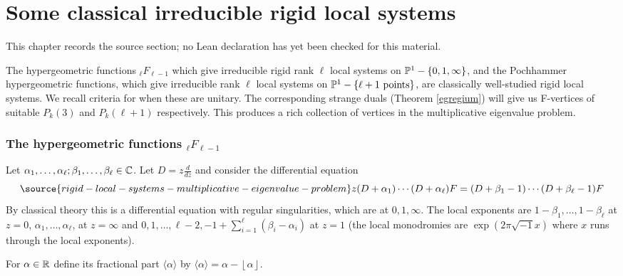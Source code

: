 \chapter{Some classical irreducible rigid local systems}
\label{rigid-local-systems-multiplicative-eigenvalue-problem-chapter-14}

\begin{remark}
\label{rigid-local-systems-multiplicative-eigenvalue-problem-chapter-14-source}
This chapter records the source section; no Lean declaration has yet been checked for this material.
\notready
\end{remark}

\label{classH}
The hypergeometric functions ${}_{\ell}F_{\ell-1}$ which give irreducible rigid rank $\ell$ local systems on $\Bbb{P}^1-\{0,1,\infty\}$, and the Pochhammer hypergeometric functions, which give irreducible rank $\ell$ local systems on $\Bbb{P}^1-\{\ell+1\text{ points}\}$, are classically well-studied rigid local systems. We recall \cite{BH,Haraoka} criteria for when these are unitary. The corresponding strange duals (Theorem \ref{egregium}) will give us F-vertices of suitable $P_k(3)$ and $P_k(\ell+1)$ respectively. This produces a rich collection of vertices in the multiplicative eigenvalue problem.
\subsection{The hypergeometric functions ${}_{\ell}F_{\ell-1}$}\label{hyper}
Let $\alpha_1,\dots,\alpha_{\ell};\beta_1,\dots,\beta_{\ell}\in \Bbb{C}$. Let $D=z\frac{d}{dz}$ and consider the differential equation
\begin{equation}\label{math383}
\source{rigid-local-systems-multiplicative-eigenvalue-problem}
z(D+\alpha_1)\cdots (D+\alpha_{\ell})F=(D+\beta_1-1)\cdots (D+\beta_{\ell}-1)F
\end{equation}
By classical theory this is a differential equation with regular singularities, which are at $0,1,\infty$.
The local exponents are $1-\beta_1,\dots,1-\beta_{\ell}$ at $z=0$, $\alpha_1,\dots,\alpha_{\ell}$, at $z=\infty$ and
$0,1,\dots,\ell-2, -1+ \sum_{i=1}^{\ell}(\beta_i-\alpha_i)$ at $z=1$ (the local monodromies are $\exp(2\pi\sqrt{-1}x)$ where $x$ runs through the local exponents).
\begin{defi}
\notready
For $\alpha\in \Bbb{R}$ define its fractional part $\langle \alpha\rangle$ by $\langle \alpha\rangle=\alpha-\left \lfloor{\alpha}\right \rfloor $.
\end{defi}


